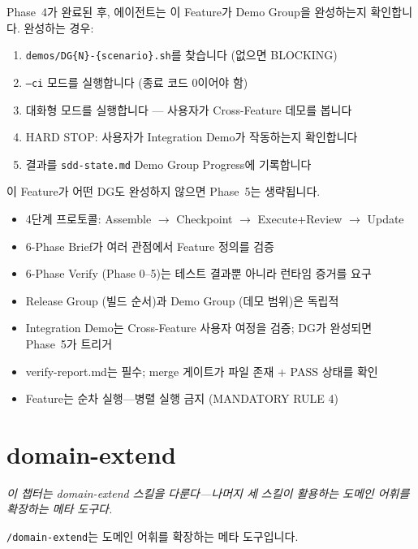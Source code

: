 \documentclass[11pt,a4paper,openright,twoside]{report}
\newcommand{\cmd}[1]{\texttt{/#1}}
\newcommand{\file}[1]{\texttt{#1}}
\begin{document}
Phase~4가 완료된 후, 에이전트는 이 Feature가 Demo Group을 완성하는지 확인합니다. 완성하는 경우:
\begin{enumerate}[nosep]
  \item \file{demos/DG\{N\}-\{scenario\}.sh}를 찾습니다 (없으면 BLOCKING)
  \item \texttt{--ci} 모드를 실행합니다 (종료 코드 0이어야 함)
  \item 대화형 모드를 실행합니다 --- 사용자가 Cross-Feature 데모를 봅니다
  \item HARD STOP: 사용자가 Integration Demo가 작동하는지 확인합니다
  \item 결과를 \file{sdd-state.md} Demo Group Progress에 기록합니다
\end{enumerate}
이 Feature가 어떤 DG도 완성하지 않으면 Phase~5는 생략됩니다.

\begin{tipbox}[챕터 11 핵심 요약]
\begin{itemize}[nosep]
  \item 4단계 프로토콜: Assemble $\rightarrow$ Checkpoint $\rightarrow$ Execute+Review $\rightarrow$ Update
  \item 6-Phase Brief가 여러 관점에서 Feature 정의를 검증
  \item 6-Phase Verify (Phase 0--5)는 테스트 결과뿐 아니라 런타임 증거를 요구
  \item Release Group (빌드 순서)과 Demo Group (데모 범위)은 독립적
  \item Integration Demo는 Cross-Feature 사용자 여정을 검증; DG가 완성되면 Phase~5가 트리거
  \item verify-report.md는 필수; merge 게이트가 파일 존재 + PASS 상태를 확인
  \item Feature는 순차 실행---병렬 실행 금지 (MANDATORY RULE 4)
\end{itemize}
\end{tipbox}


\chapter{domain-extend}
\label{ch:domain-extend}

\textit{이 챕터는 domain-extend 스킬을 다룬다---나머지 세 스킬이 활용하는 도메인 어휘를 확장하는 메타 도구다.}

\cmd{domain-extend}는 도메인 어휘를 확장하는 메타 도구입니다.
\end{document}
